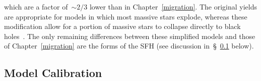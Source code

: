 which are a factor of~$\sim$$2 / 3$ lower than in Chapter~\ref{migration}.
The original yields are appropriate for models in which most massive stars
explode, whereas these modification allow for a portion of massive stars to
collapse directly to black holes~\citep{OConnor2011, Pejcha2015, Gerke2015,
Ertl2016, Sukhbold2016, Adams2017, Basinger2021, Griffith2021b}.
The only remaining differences between these simplified models and those of
Chapter~\ref{migration} are the forms of the SFH (see discussion
in~\S~\ref{outflows:sec:gce:calibration} below).

\subsection{Model Calibration}
\label{outflows:sec:gce:calibration}

